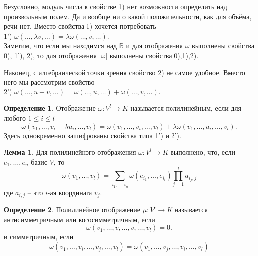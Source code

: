 \documentclass[10pt,a4paper,oneside]{book}
\theoremstyle{definition}
\newtheorem*{defn}{Определение}
\newtheorem{lem}{Лемма}
\newcommand{\mb}[1]{\mathbb{#1}}
\def\lm{\begin{lem}}
\def\elm{\end{lem}}
\begin{document}
Безусловно, модуль числа в свойстве 1) нет возможности определить над произвольным полем. Да и вообще ни о какой положительности, как для объёма, речи нет. Вместо свойства 1) хочется потребовать\\
1') $\omega(\dots,\lambda v,\dots)=\lambda \omega(\dots,v,\dots)$.\\
Заметим, что если мы находимся над $\mb R$ и  для отображения $\omega$ выполнены свойства 0), 1'), 2), то для отображения $|\omega|$ выполнены свойства 0),1),2). 

Наконец, с алгебраической точки зрения свойство 2) не самое удобное. Вместо него мы рассмотрим свойство\\
2') $\omega(\dots,u+v,\dots)=\omega(\dots,u,\dots)+\omega(\dots,v,\dots)$.


\begin{defn}
Отображение $\omega \colon  V^l\to K $ называется полилинейным, если для любого $1\leq i\leq l$
$$\omega(v_1,\dots,v_i+\lambda u_i,\dots, v_l)= \omega(v_1,\dots,v_i,\dots, v_l)+\lambda\omega(v_1,\dots,u_i,\dots, v_l).$$
Здесь одновременно зашифрованы свойства типа 1')  и  2').
\end{defn}

\lm Для полилинейного отображения $\omega \colon V^l \to K $ выполнено, что, если $e_1,\dots,e_n$ базис $V$, то
$$\omega(v_1,\dots,v_l)=\sum_{i_1,\dots,i_n} \omega(e_{i_1},\dots,e_{i_l}) \prod_{j=1}^l a_{i_j,j}$$
где $a_{i,j}$ -- это $i$-ая координата $v_j$.\\
\elm

\begin{defn}
Полилинейное отображение $\mu \colon V^l\to K $ называется антисимметричным или кососимметричным, если
$$\omega(v_1,\dots,v,\dots,v,\dots, v_l)=0.$$ и симметричным, если
$$\omega(v_1,\dots,v_i,\dots,v_j,\dots, v_l)=\omega(v_1,\dots,v_j,\dots,v_i,\dots, v_l)$$
\end{defn}
\end{document}
